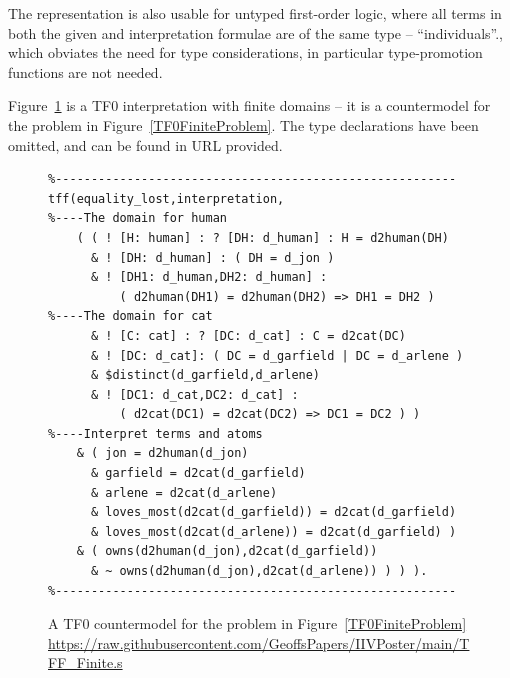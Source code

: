 \documentclass[letterpaper]{article}
\begin{document}
{%
The representation is also usable for untyped first-order logic, where all terms in both the 
given and interpretation formulae are of the same type -- ``individuals''., which obviates the 
need for type considerations, in particular type-promotion functions are not needed.
 
Figure~\ref{TF0FiniteInterpretation} is a TF0 interpretation with finite domains -- it is a 
countermodel for the problem in Figure~\ref{TF0FiniteProblem}.
The type declarations have been omitted, and can be found in URL provided.

\begin{figure}[htbp]
\scriptsize
{}
\begin{verbatim}
%--------------------------------------------------------
tff(equality_lost,interpretation,
%----The domain for human
    ( ( ! [H: human] : ? [DH: d_human] : H = d2human(DH)
      & ! [DH: d_human] : ( DH = d_jon )
      & ! [DH1: d_human,DH2: d_human] :
          ( d2human(DH1) = d2human(DH2) => DH1 = DH2 )
%----The domain for cat
      & ! [C: cat] : ? [DC: d_cat] : C = d2cat(DC)
      & ! [DC: d_cat]: ( DC = d_garfield | DC = d_arlene )
      & $distinct(d_garfield,d_arlene)
      & ! [DC1: d_cat,DC2: d_cat] :
          ( d2cat(DC1) = d2cat(DC2) => DC1 = DC2 ) )
%----Interpret terms and atoms
    & ( jon = d2human(d_jon)
      & garfield = d2cat(d_garfield)
      & arlene = d2cat(d_arlene)
      & loves_most(d2cat(d_garfield)) = d2cat(d_garfield)
      & loves_most(d2cat(d_arlene)) = d2cat(d_garfield) )
    & ( owns(d2human(d_jon),d2cat(d_garfield))
      & ~ owns(d2human(d_jon),d2cat(d_arlene)) ) ) ).
%--------------------------------------------------------
\end{verbatim}
\caption{A TF0 countermodel for the problem in Figure~\ref{TF0FiniteProblem} \\
{\scriptsize \url{https://raw.githubusercontent.com/GeoffsPapers/IIVPoster/main/TFF_Finite.s}}}
\label{TF0FiniteInterpretation}
\end{figure}

}
\end{document}
